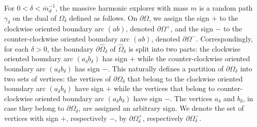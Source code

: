 \documentclass{article}
\theoremstyle{definition}
\theoremstyle{remark}
\theoremstyle{remark}
\begin{document}
For $0<\delta < \overline{m}_d^{-1}$, the massive harmonic explorer with mass $m$ is a random path $\gamma_{\delta}$ on the dual of $\Omega_{\delta}$ defined as follows. On $\partial \Omega$, we assign the sign $+$ to the clockwise oriented boundary arc $(ab)$, denoted $\partial \Omega^{+}$, and the sign $-$ to the counter-clockwise oriented boundary arc $(ab)$, denoted $\partial \Omega^{-}$. Correspondingly, for each $\delta >0$, the boundary $\partial \hat \Omega_{\delta}$ of $\hat \Omega_{\delta}$ is split into two parts: the clockwise oriented boundary arc $(a_{\delta}b_{\delta})$ has sign $+$ while the counter-clockwise oriented boundary arc $(a_{\delta}b_{\delta})$ has sign $-$. This naturally defines a partition of $\partial \Omega_{\delta}$ into two sets of vertices: the vertices of  $\partial \Omega_{\delta}$ that belong to the clockwise oriented boundary arc $(a_{\delta}b_{\delta})$ have sign $+$ while the vertices that belong to counter-clockwise oriented boundary arc $(a_{\delta}b_{\delta})$ have sign $-$. The vertices $a_{\delta}$ and $b_{\delta}$, in case they belong to $\partial \Omega_{\delta}$, are assigned an arbitrary sign. We denote the set of vertices with sign $+$, respectively $-$, by $\partial \Omega_{\delta}^{+}$, respectively $\partial \Omega_{\delta}^{-}$.
\end{document}
